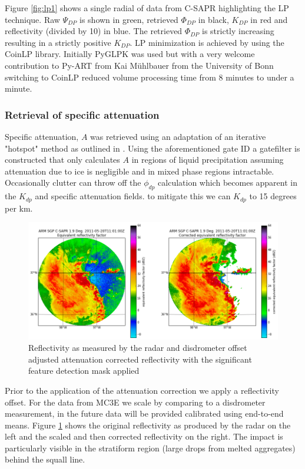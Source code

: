 \documentclass[twocol]{ametsoc}
\begin{document}
Figure \ref{fig:lp1} shows a single radial of data from C-SAPR highlighting the LP technique. Raw $\Psi_{DP}$ is shown in green, retrieved $\Phi_{DP}$ in black, $K_{DP}$ in red and reflectivity (divided by 10) in blue. The retrieved  $\Phi_{DP}$ is strictly increasing resulting in a strictly positive $K_{DP}$. LP minimization is achieved by using the CoinLP library. Initially PyGLPK was used but with a very welcome contribution to Py-ART from Kai M{\"u}hlbauer from the University of Bonn switching to CoinLP reduced volume processing time from 8 minutes to under a minute.  

\subsubsection{Retrieval of specific attenuation}
\label{sssec:ac}
Specific attenuation, $A$ was retrieved using an adaptation of an iterative "hotspot" method as outlined in \cite{gu_polarimetric_2011}. Using the aforementioned gate ID a gatefilter is constructed that only calculates $A$ in regions of liquid precipitation assuming attenuation due to ice is negligible and in mixed phase regions intractable. Occasionally clutter can throw off the $\phi_{dp}$ calculation which becomes apparent in the $K_{dp}$ and specific attenuation fields. to mitigate this we can $K_{dp}$ to 15 degrees per km. 

\begin{figure}[h]
    \centering
    \includegraphics[width=0.95\columnwidth]{refl_before_and_after.png}
    \caption{Reflectivity as measured by the radar and disdrometer offset adjusted attenuation corrected reflectivity with the significant feature detection mask applied}
    \label{fig:zfix}
\end{figure}

Prior to the application of the attenuation correction we apply a reflectivity offset. For the data from MC3E we scale by comparing to a disdrometer measurement, in the future data will be provided calibrated using end-to-end means.  Figure \ref{fig:zfix} shows the original  reflectivity as produced by the radar on the left and the scaled and then corrected reflectivity on the right. The impact is particularly visible in the stratiform region (large drops from melted aggregates) behind the squall line. 
\end{document}
